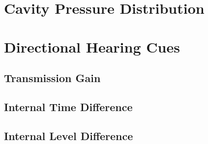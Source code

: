 \section{Cavity Pressure Distribution}

\section{Directional Hearing Cues}

\subsection{Transmission Gain}

\subsection{Internal Time Difference}

\subsection{Internal Level Difference}